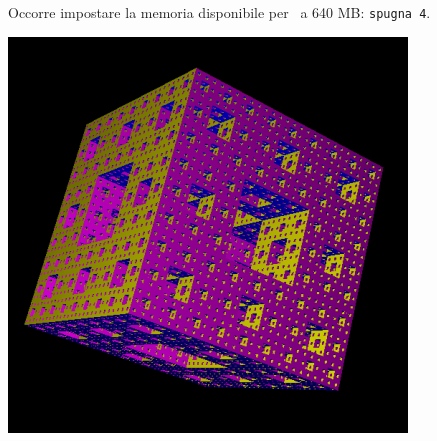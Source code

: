 Occorre impostare la memoria disponibile per \xlogo\ a 640 MB: \texttt{spugna 4}.

\begin{center}
 \includegraphics{pics/menger-menger4.png}
\end{center}